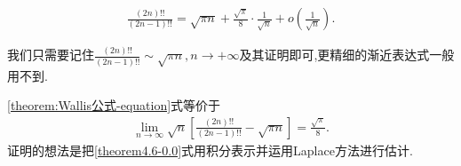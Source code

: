 \documentclass[../../main.tex]{subfiles}%
\begin{document}
\begin{theorem}[Wallis公式]\label{theorem:Wallis公式}
\begin{align}\label{theorem:Wallis公式-equation}
\frac{(2n)!!}{(2n - 1)!!}=\sqrt{\pi n}+\frac{\sqrt{\pi}}{8}\cdot\frac{1}{\sqrt{n}}+o\left(\frac{1}{\sqrt{n}}\right).
\end{align}
\end{theorem}
\begin{remark}
我们只需要记住$\frac{(2n)!!}{(2n-1)!!}\sim \sqrt{\pi n},n\rightarrow +\infty$及其证明即可,更精细的渐近表达式一般用不到.
\end{remark}
\begin{note}
\eqref{theorem:Wallis公式-equation}式等价于
\begin{align}\label{theorem4.6-0.0}
\lim_{n\rightarrow\infty}\sqrt{n}\left[\frac{(2n)!!}{(2n - 1)!!}-\sqrt{\pi n}\right]=\frac{\sqrt{\pi}}{8}.
\end{align}
证明的想法是把\eqref{theorem4.6-0.0}式用积分表示并运用Laplace方法进行估计.
\end{note}
\end{document}
